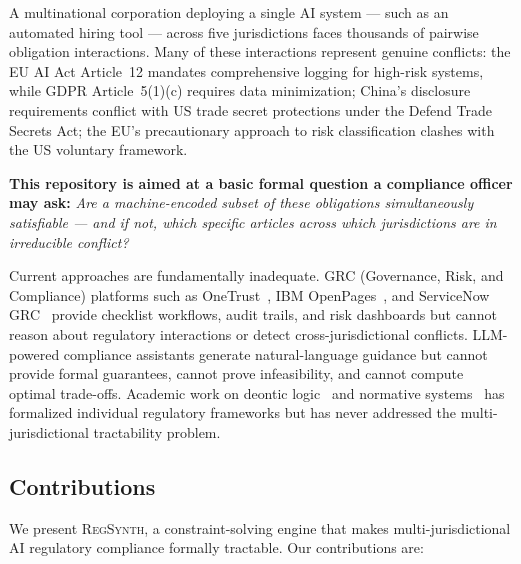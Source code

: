 \documentclass[11pt,twocolumn]{article}
\newcommand{\regsynth}{\textsc{RegSynth}}
\begin{document}
A multinational corporation deploying a single AI system — such as an automated
hiring tool — across five jurisdictions faces thousands of pairwise obligation
interactions. Many of these interactions represent genuine conflicts:
the EU AI Act Article~12 mandates comprehensive logging for high-risk systems,
while GDPR Article~5(1)(c) requires data minimization; China's disclosure
requirements conflict with US trade secret protections under the Defend Trade
Secrets Act; the EU's precautionary approach to risk classification clashes
with the US voluntary framework.

\textbf{This repository is aimed at a basic formal question a compliance officer may ask:} \emph{Are a machine-encoded subset of these obligations simultaneously satisfiable — and if not, which specific articles across which jurisdictions are in irreducible conflict?}

Current approaches are fundamentally inadequate. GRC (Governance, Risk, and
Compliance) platforms such as OneTrust~\cite{onetrust2024},
IBM OpenPages~\cite{ibmopenpages2024}, and
ServiceNow GRC~\cite{servicenow2024} provide checklist workflows, audit trails,
and risk dashboards but cannot reason about regulatory interactions or detect
cross-jurisdictional conflicts. LLM-powered compliance assistants generate
natural-language guidance but cannot provide formal guarantees, cannot prove
infeasibility, and cannot compute optimal trade-offs.
Academic work on deontic logic~\cite{vonwright1951} and normative
systems~\cite{governatori2013compliance} has formalized individual regulatory
frameworks but has never addressed the multi-jurisdictional tractability problem.

\subsection{Contributions}

We present \regsynth{}, a constraint-solving engine that makes multi-jurisdictional
AI regulatory compliance formally tractable. Our contributions are:
\end{document}
